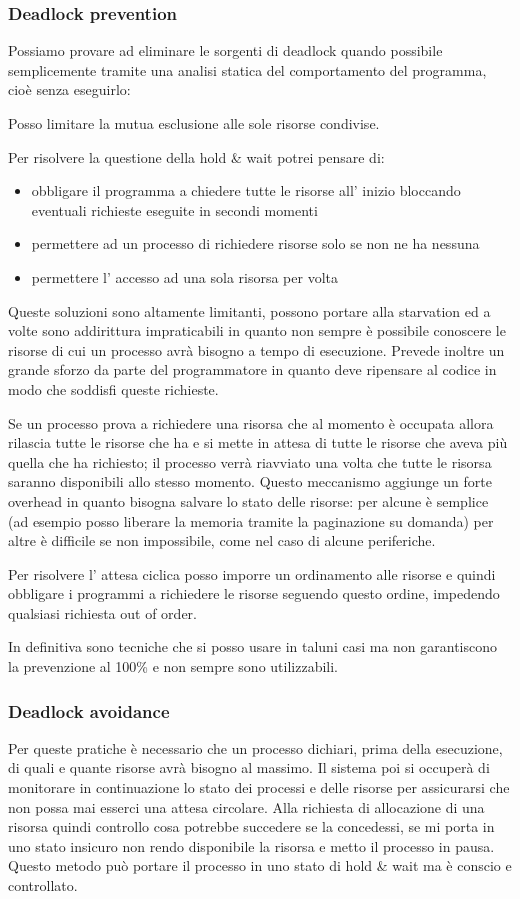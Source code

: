 \subsubsection{Deadlock prevention}
Possiamo provare ad eliminare le sorgenti di deadlock quando possibile semplicemente tramite una analisi statica del comportamento del programma, cioè senza eseguirlo:

Posso limitare la mutua esclusione alle sole risorse condivise.

Per risolvere la questione della hold \& wait potrei pensare di:
\begin{itemize}
    \item obbligare il programma a chiedere tutte le risorse all' inizio bloccando eventuali richieste eseguite in secondi momenti
    \item permettere ad un processo di richiedere risorse solo se non ne ha nessuna
    \item permettere l' accesso ad una sola risorsa per volta
\end{itemize}
Queste soluzioni sono altamente limitanti, possono portare alla starvation ed a volte sono addirittura impraticabili in quanto non sempre è possibile conoscere le risorse di cui un processo avrà bisogno a tempo di esecuzione.
Prevede inoltre un grande sforzo da parte del programmatore in quanto deve ripensare al codice in modo che soddisfi queste richieste.

Se un processo prova a richiedere una risorsa che al momento è occupata allora rilascia tutte le risorse che ha e si mette in attesa di tutte le risorse che aveva più quella che ha richiesto; il processo verrà riavviato una volta che tutte le risorsa saranno disponibili allo stesso momento.
Questo meccanismo aggiunge un forte overhead in quanto bisogna salvare lo stato delle risorse: per alcune è semplice (ad esempio posso liberare la memoria tramite la paginazione su domanda) per altre è difficile se non impossibile, come nel caso di alcune periferiche.

Per risolvere l' attesa ciclica posso imporre un ordinamento alle risorse e quindi obbligare i programmi a richiedere le risorse seguendo questo ordine, impedendo qualsiasi richiesta out of order.

In definitiva sono tecniche che si posso usare in taluni casi ma non garantiscono la prevenzione al 100\% e non sempre sono utilizzabili.

\subsubsection{Deadlock avoidance}
Per queste pratiche è necessario che un processo dichiari, prima della esecuzione, di quali e quante risorse avrà bisogno al massimo.
Il sistema poi si occuperà di monitorare in continuazione lo stato dei processi e delle risorse per assicurarsi che non possa mai esserci una attesa circolare.
Alla richiesta di allocazione di una risorsa quindi controllo cosa potrebbe succedere se la concedessi, se mi porta in uno stato insicuro non rendo disponibile la risorsa e metto il processo in pausa.
Questo metodo può portare il processo in uno stato di hold \& wait ma è conscio e controllato.

